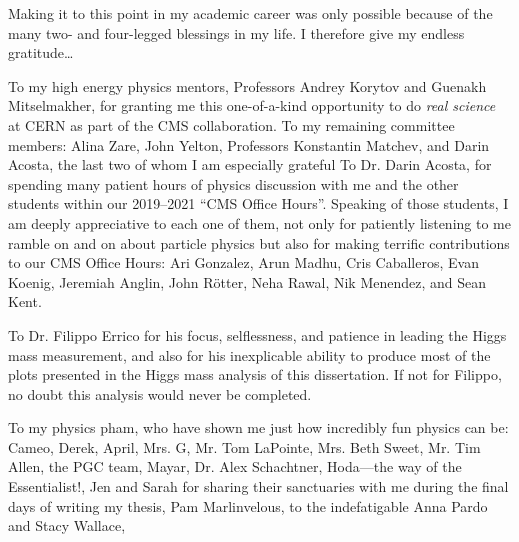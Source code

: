 
Making it to this point in my academic career was only possible because of the many two- and four-legged blessings in my life.
I therefore give my endless gratitude\ldots

To my high energy physics mentors, Professors Andrey Korytov and Guenakh Mitselmakher, for granting me this one-of-a-kind opportunity to do \emph{real science} at CERN as part of the CMS collaboration.
To my remaining committee members: Alina Zare, John Yelton, Professors Konstantin Matchev, and Darin Acosta, the last two of whom I am especially grateful 
To Dr. Darin Acosta, for spending many patient hours of physics discussion with me and the other students within our 2019--2021 ``CMS Office Hours''.
Speaking of those students, I am deeply appreciative to each one of them, not only for patiently listening to me ramble on and on about particle physics but also for making terrific contributions to our CMS Office Hours:
Ari Gonzalez, Arun Madhu, Cris Caballeros, Evan Koenig, Jeremiah Anglin, John Rötter, Neha Rawal, Nik Menendez, and Sean Kent.

To Dr. Filippo Errico for his focus, selflessness, and patience in leading the Higgs mass measurement, and also for his inexplicable ability to produce most of the plots presented in the Higgs mass analysis of this dissertation.
If not for Filippo, no doubt this analysis would never be completed.





To my physics pham, who have shown me just how incredibly fun physics can be:
Cameo, Derek, April,
Mrs. G,
Mr. Tom LaPointe,
Mrs. Beth Sweet,
Mr. Tim Allen,
the PGC team, Mayar, Dr. Alex Schachtner,
Hoda---the way of the Essentialist!,
Jen and Sarah for sharing their sanctuaries with me during the final days of writing my thesis,
Pam Marlinvelous,
to the indefatigable Anna Pardo and Stacy Wallace,

